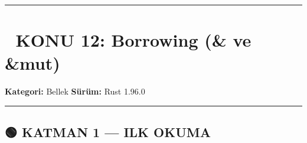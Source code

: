 \documentclass[12pt,a4paper]{article}
\begin{document}
\begin{center}\rule{0.5\linewidth}{0.5pt}\end{center}

\section{📘 KONU 12: Borrowing (\& ve \&mut)}\label{konu-12-borrowing-ve-mut}

\textbf{Kategori:} Bellek \textbar{} \textbf{Sürüm:} Rust 1.96.0

\begin{center}\rule{0.5\linewidth}{0.5pt}\end{center}

\subsection{🟢 KATMAN 1 --- ILK OKUMA}\label{katman-1-—-ilk-okuma-11}
\end{document}
